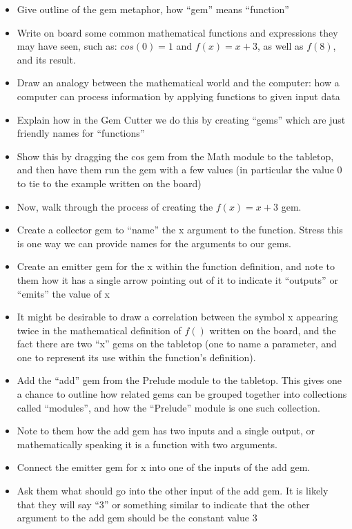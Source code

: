 	{
		\begin{itemize}
			\item Give outline of the gem metaphor, how ``gem'' means ``function''
			\item Write on board some common mathematical functions and expressions they may have seen, such as: \(cos(0) = 1\) and \(f(x) = x + 3\), as well as \(f(8)\), and its result.
			\item Draw an analogy between the mathematical world and the computer: how a computer can process information by applying functions to given input data
			\item Explain how in the Gem Cutter we do this by creating ``gems'' which are just friendly names for ``functions''
			\item Show this by dragging the cos gem from the Math module to the tabletop, and then have them run the gem with a few values (in particular the value 0 to tie to the example written on the board)
			\item Now, walk through the process of creating the \(f(x) = x + 3\) gem.
			\item Create a collector gem to ``name'' the x argument to the function. Stress this is one way we can provide names for the arguments to our gems.
			\item Create an emitter gem for the x within the function definition, and note to them how it has a single arrow pointing out of it to indicate it ``outputs'' or ``emits'' the value of x
			\item It might be desirable to draw a correlation between the symbol x appearing twice in the mathematical definition of \(f()\) written on the board, and the fact there are two ``x'' gems on the tabletop (one to name a parameter, and one to represent its use within the function's definition).
			\item Add the ``add'' gem from the Prelude module to the tabletop.  This gives one a chance to outline how related gems can be grouped together into collections called ``modules'', and how the ``Prelude'' module is one such collection.
			\item Note to them how the add gem has two inputs and a single output, or mathematically speaking it is a function with two arguments.
			\item Connect the emitter gem for x into one of the inputs of the add gem.
			\item Ask them what should go into the other input of the add gem.  It is likely that they will say ``3'' or something similar to indicate that the other argument to the add gem should be the constant value 3

\end{itemize}}
